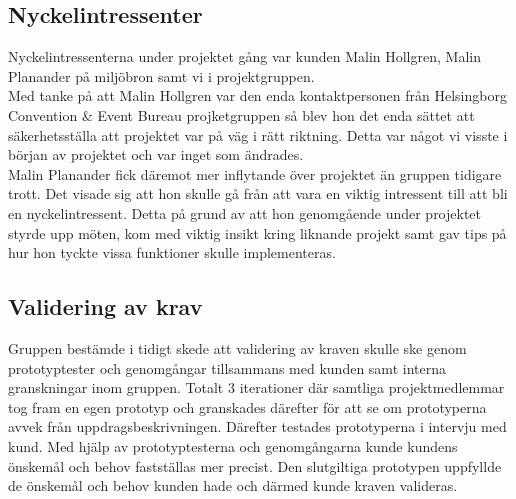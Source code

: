 \documentclass[12pt]{article}
\begin{document}
\subsection{Nyckelintressenter}
Nyckelintressenterna under projektet gång var kunden Malin Hollgren, Malin Planander på miljöbron samt vi i projektgruppen. \\
Med tanke på att Malin Hollgren var den enda kontaktpersonen från Helsingborg Convention & Event Bureau projketgruppen så blev hon det enda sättet att säkerhetsställa att projektet var på väg i rätt riktning. Detta var något vi visste i början av projektet och var inget som ändrades. \\
Malin Planander fick däremot mer inflytande över projektet än gruppen tidigare trott. Det visade sig att hon skulle gå från att vara en viktig intressent till att bli en nyckelintressent. Detta på grund av att hon genomgående under projektet styrde upp möten, kom med viktig insikt kring liknande projekt samt gav tips på hur hon tyckte vissa funktioner skulle implementeras.
\\ 

\subsection{Validering av krav}
Gruppen bestämde i tidigt skede att validering av kraven skulle ske genom prototyptester och genomgångar tillsammans med kunden samt interna granskningar inom gruppen. Totalt 3 iterationer där samtliga projektmedlemmar tog fram en egen prototyp och granskades därefter för att se om prototyperna avvek från uppdragsbeskrivningen. Därefter testades prototyperna i intervju med kund. Med hjälp av prototyptesterna och genomgångarna kunde kundens önskemål och behov fastställas mer precist. Den slutgiltiga prototypen uppfyllde de önskemål och behov kunden hade och därmed kunde kraven valideras.\\\\
\end{document}
